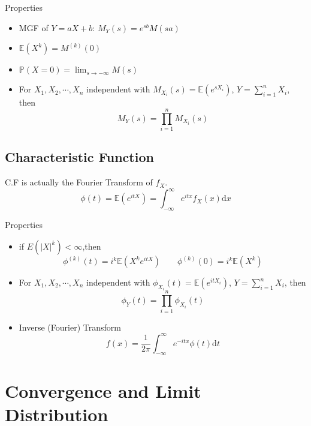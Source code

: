     Properties
    \begin{itemize}
        \item MGF of $Y=aX+b$: $
            M_Y(s)=e^{sb}M(sa)    $
        \item $\mathbb{E}(X^k)=M^{(k)}(0)$
        \item $\mathbb{P}(X=0)={\displaystyle\lim_{s\to -\infty}}M(s)$
        \item For $X_1,X_2,\cdots,X_n$ independent with $M_{X_i}(s)=\mathbb{E}(e^{sX_i})$, $Y={\displaystyle \sum_{i=1}^n} X_i$, then
        \begin{equation}    
            M_Y(s)=\prod_{i=1}^n M_{X_i}(s)
        \end{equation}
    \end{itemize}
\subsection{Characteristic Function}
    C.F is actually the Fourier Transform of $f_X$.
    \begin{equation}
        \phi(t)=\mathbb{E}(e^{itX}) = \int_{-\infty}^\infty e^{itx}f_X(x)\mathrm{d}x
    \end{equation}

    Properties
    \begin{itemize}
    \item if $E(|X|^k)<\infty$,then
    \begin{equation}
        \phi^{(k)}(t)=i^k\mathbb{E}(X^ke^{itX})\qquad \phi^{(k)}(0)=i^k\mathbb{E}(X^k)    
    \end{equation}
    \item For $X_1,X_2,\cdots,X_n$ independent with $\phi_{X_i}(t)=\mathbb{E}(e^{itX_i})$, $Y={\displaystyle \sum_{i=1}^n} X_i$, then
    \begin{equation}
        \phi_Y(t)=\prod_{i=1}^n \phi_{X_i}(t)
    \end{equation}
    \item Inverse (Fourier) Transform
    \begin{equation}
        f(x)=\frac{1}{2\pi}\int_{-\infty}^\infty e^{-itx}\phi(t)\mathrm{d}t    
    \end{equation}
\end{itemize}



\section{Convergence and Limit Distribution}
